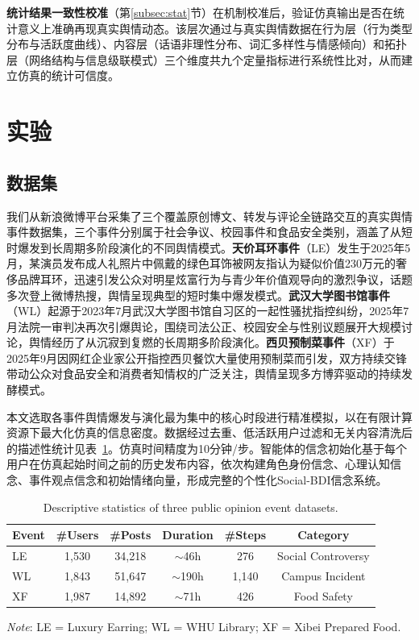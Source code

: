 \documentclass[a4paper,fleqn]{cas-dc}
\renewcommand{\footnotesize}{\scriptsize}
\begin{document}
\textbf{统计结果一致性校准}（第\ref{subsec:stat}节）在机制校准后，验证仿真输出是否在统计意义上准确再现真实舆情动态。该层次通过与真实舆情数据在行为层（行为类型分布与活跃度曲线）、内容层（话语非理性分布、词汇多样性与情感倾向）和拓扑层（网络结构与信息级联模式）三个维度共九个定量指标进行系统性比对，从而建立仿真的统计可信度。

\section{实验}\label{sec:exp}

\subsection{数据集}

我们从新浪微博平台采集了三个覆盖原创博文、转发与评论全链路交互的真实舆情事件数据集，三个事件分别属于社会争议、校园事件和食品安全类别，涵盖了从短时爆发到长周期多阶段演化的不同舆情模式。\textbf{天价耳环事件}（LE）发生于2025年5月，某演员发布成人礼照片中佩戴的绿色耳饰被网友指认为疑似价值230万元的奢侈品牌耳环，迅速引发公众对明星炫富行为与青少年价值观导向的激烈争议，话题多次登上微博热搜，舆情呈现典型的短时集中爆发模式。\textbf{武汉大学图书馆事件}（WL）起源于2023年7月武汉大学图书馆自习区的一起性骚扰指控纠纷，2025年7月法院一审判决再次引爆舆论，围绕司法公正、校园安全与性别议题展开大规模讨论，舆情经历了从沉寂到复燃的长周期多阶段演化。\textbf{西贝预制菜事件}（XF）于2025年9月因网红企业家公开指控西贝餐饮大量使用预制菜而引发，双方持续交锋带动公众对食品安全和消费者知情权的广泛关注，舆情呈现多方博弈驱动的持续发酵模式。

本文选取各事件舆情爆发与演化最为集中的核心时段进行精准模拟，以在有限计算资源下最大化仿真的信息密度。数据经过去重、低活跃用户过滤和无关内容清洗后的描述性统计见表~\ref{tab:dataset}。仿真时间精度为10分钟/步。智能体的信念初始化基于每个用户在仿真起始时间之前的历史发布内容，依次构建角色身份信念、心理认知信念、事件观点信念和初始情绪向量，形成完整的个性化Social-BDI信念系统。

\begin{table}[!t]
\centering
\caption{Descriptive statistics of three public opinion event datasets.}
\label{tab:dataset}
\footnotesize
\renewcommand{\arraystretch}{1.05}
\begin{tabular}{@{}lccccc@{}}
\toprule
\textbf{Event} & \textbf{\#Users} & \textbf{\#Posts} & \textbf{Duration} & \textbf{\#Steps} & \textbf{Category} \\
\midrule
LE & 1,530 & 34,218 & ${\sim}$46h & 276 & Social Controversy \\
WL & 1,843 & 51,647 & ${\sim}$190h & 1,140 & Campus Incident \\
XF & 1,987 & 14,892 & ${\sim}$71h & 426 & Food Safety \\
\bottomrule
\end{tabular}
\par\vspace{2pt}
{\scriptsize{}\selectfont
\textit{Note}: LE = Luxury Earring; WL = WHU Library; XF = Xibei Prepared Food.}
\end{table}
\end{document}
